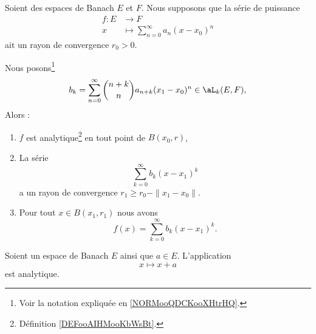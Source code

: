 \begin{theorem}	\label{THOooHSXLooMCzTTD}
	Soient des espaces de Banach \( E\) et \( F\). Nous supposons que la série de puissance
	\begin{equation}
		\begin{aligned}
			f\colon E & \to F                                   \\
			x         & \mapsto \sum_{n=0}^{\infty}a_n(x-x_0)^n
		\end{aligned}
	\end{equation}
	ait un rayon de convergence \( r_0>0\).

	Nous posons\footnote{Voir la notation expliquée en \ref{NORMooQDCKooXHtrHQ}.}
	\begin{equation}
		b_k=\sum_{n=0}^{\infty}\binom{n+k}{n}a_{n+k}(x_1-x_0)^n\in\aL_k(E,F),
	\end{equation}
	Alors :
	\begin{enumerate}
		\item		\label{ITEMooWBTAooGrKzpo}
		      \( f\) est analytique\footnote{Définition \ref{DEFooAIHMooKbWsBt}.} en tout point de \( B(x_0,r)\),
		\item
		      La série
		      \begin{equation}
			      \sum_{k=0}^{\infty}b_k(x-x_1)^k
		      \end{equation}
		      a un rayon de convergence \( r_1\geq r_0-\| x_1-x_0 \|\).
		\item
		      Pour tout \( x\in B(x_1,r_1)\) nous avons
		      \begin{equation}
			      f(x)=\sum_{k=0}^{\infty}b_k(x-x_1)^k.
		      \end{equation}
	\end{enumerate}
\end{theorem}

\begin{proposition}	\label{PROPooFEMWooDwAYyO}
	Soient un espace de Banach \( E\) ainsi que \( a\in E\). L'application
	\begin{equation}
		x\mapsto x+a
	\end{equation}
	est analytique.
\end{proposition}


